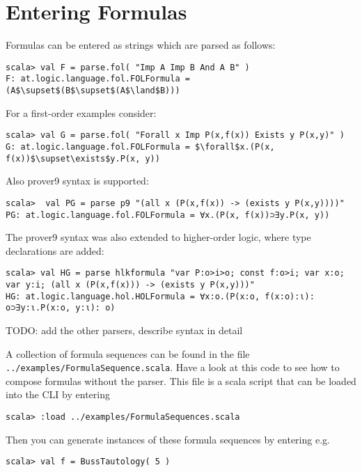 \documentclass[a4paper,11pt]{article}
\renewcommand{\land}{\wedge}
\newcommand{\cli}[1]{{\tt {#1}}}
\newenvironment{meta}{\color{red}}{\color{black}}
\begin{document}

\section{Entering Formulas}\label{sec.entering_formulas}

Formulas can be entered as strings which are parsed as follows:
\begin{lstlisting}
scala> val F = parse.fol( "Imp A Imp B And A B" )
F: at.logic.language.fol.FOLFormula = (A$\supset$(B$\supset$(A$\land$B)))
\end{lstlisting}
For a first-order examples consider:
\begin{lstlisting}
scala> val G = parse.fol( "Forall x Imp P(x,f(x)) Exists y P(x,y)" )
G: at.logic.language.fol.FOLFormula = $\forall$x.(P(x, f(x))$\supset\exists$y.P(x, y))
\end{lstlisting}

Also prover9 syntax is supported: %

\begin{lstlisting}
scala>  val PG = parse p9 "(all x (P(x,f(x)) -> (exists y P(x,y))))"
PG: at.logic.language.fol.FOLFormula = ∀x.(P(x, f(x))⊃∃y.P(x, y))
\end{lstlisting}

The prover9 syntax was also extended to higher-order logic, where type declarations are added:

\begin{lstlisting}
scala> val HG = parse hlkformula "var P:o>i>o; const f:o>i; var x:o; var y:i; (all x (P(x,f(x))) -> (exists y P(x,y)))"
HG: at.logic.language.hol.HOLFormula = ∀x:ο.(P(x:ο, f(x:ο):ι): o⊃∃y:ι.P(x:ο, y:ι): o)
\end{lstlisting}


\begin{meta}
TODO: add the other parsers, describe syntax in detail
\end{meta}

A collection of formula sequences can be found in the file \cli{../examples/FormulaSequence.scala}.
Have a look at this code to see how to compose formulas without the parser. This file is
a scala script that can be loaded into the CLI by entering
%
\begin{lstlisting}
scala> :load ../examples/FormulaSequences.scala
\end{lstlisting}
%
Then you can generate instances of these formula sequences by entering e.g.
%
\begin{lstlisting}
scala> val f = BussTautology( 5 )
\end{lstlisting}
\end{document}
